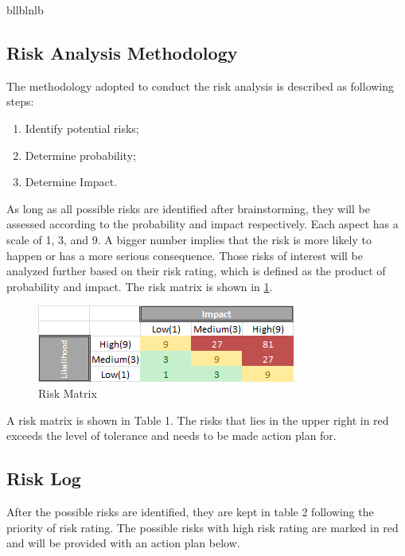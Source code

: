

bllblnlb
\subsection{Risk Analysis Methodology}
The methodology adopted to conduct the risk analysis is described as following steps:  
\begin{enumerate}[itemsep=0pt, topsep=3pt, partopsep=3pt]
  \item Identify potential risks;
  \item Determine probability;
  \item Determine Impact.
\end{enumerate}

As long as all possible risks are identified after brainstorming, they will be assessed according to the probability and impact respectively. Each aspect has a scale of 1, 3, and 9. A bigger number implies that the risk is more likely to happen or has a more serious consequence. Those risks of interest will be analyzed further based on their risk rating, which is defined as the product of probability and impact. The risk matrix is shown in \ref{fig:riskmatrix}.  


\begin{figure}[h!]
\centering
\includegraphics[scale=1.0]{Pictures/riskmatrix.png}
\caption{Risk Matrix}
\label{fig:riskmatrix}
\end{figure}

A risk matrix is shown in Table 1. The risks that lies in the upper right in red exceeds the level of tolerance and needs to be made action plan for. 
\subsection{Risk Log}
After the possible risks are identified, they are kept in table 2 following the priority of risk rating. The possible risks with high risk rating are marked in red and will be provided with an action plan below. 

